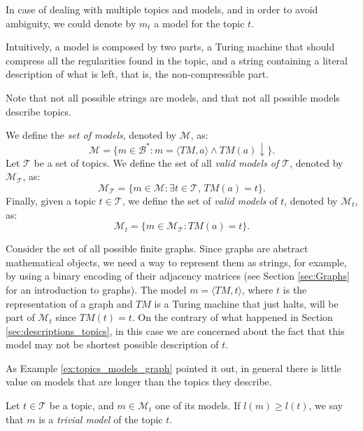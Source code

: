 \begin{notation}
In case of dealing with multiple topics and models, and in order to avoid ambiguity, we could denote by $m_t$ a model for the topic $t$.
\end{notation}

Intuitively, a model is composed by two parts, a Turing machine that should compress all the regularities found in the topic, and a string containing a literal description of what is left, that is, the non-compressible part.

Note that not all possible strings are models, and that not all possible models describe topics.

\begin{definition}
\label{def:descriptions_model}
We define the \emph{set of models}, denoted by $\mathcal{M}$, as:
\[
\mathcal{M} = \{ m \in \mathcal{B}^\ast : m = \langle TM,a \rangle \wedge TM(a) \downarrow \}.
\]
Let $\mathcal{T}$ be a set of topics. We define the set of all \emph{valid models of $\mathcal{T}$}, denoted by $\mathcal{M}_{\mathcal{T}}$, as:
\[
\mathcal{M}_{\mathcal{T}} = \{ m \in \mathcal{M} : \exists t \in \mathcal{T},\, TM(a) = t \}.
\]
Finally, given a topic $t \in \mathcal{T}$, we define the set of \emph{valid models} of $t$, denoted by $\mathcal{M}_t$, as:
\[
\mathcal{M}_t = \{ m \in \mathcal{M}_{\mathcal{T}} : TM(a) = t \}.
\]
\end{definition}

\begin{example}
\label{ex:topics_models_graph}
Consider the set of all possible finite graphs. Since graphs are abstract mathematical objects, we need a way to represent them as strings, for example, by using a binary encoding of their adjacency matrices (see Section \ref{sec:Graphs} for an introduction to graphs). The model $m = \langle TM, t \rangle$, where $t$ is the representation of a graph and $TM$ is a Turing machine that just halts, will be part of $\mathcal{M}_t$ since $TM(t) = t$. On the contrary of what happened in Section \ref{sec:descriptions_topics}, in this case we are concerned about the fact that this model may not be shortest possible description of $t$.
\end{example}

As Example \ref{ex:topics_models_graph} pointed it out, in general there is little value on models that are longer than the topics they describe.

\begin{definition}
\label{def:trivial_model}
Let $t \in \mathcal{T}$ be a topic, and $m \in \mathcal{M}_t$ one of its models. If $l(m) \geq l(t)$, we say that $m$ is a \emph{trivial model} of the topic $t$.
\end{definition}

